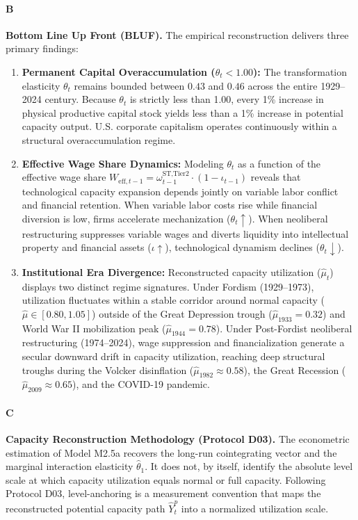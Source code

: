 \paragraph{B}
\textbf{Bottom Line Up Front (BLUF).} The empirical reconstruction delivers three primary findings:

\begin{enumerate}
	\item \textbf{Permanent Capital Overaccumulation ($\theta_t < 1.00$):} The transformation elasticity $\theta_t$ remains bounded between $0.43$ and $0.46$ across the entire 1929–2024 century. Because $\theta_t$ is strictly less than 1.00, every 1\% increase in physical productive capital stock yields less than a 1\% increase in potential capacity output. U.S. corporate capitalism operates continuously within a structural overaccumulation regime.
	\item \textbf{Effective Wage Share Dynamics:} Modeling $\theta_t$ as a function of the effective wage share $W_{\text{eff}, t-1} = \omega_{t-1}^{\text{ST,Tier2}} \cdot (1 - \iota_{t-1})$ reveals that technological capacity expansion depends jointly on variable labor conflict and financial retention. When variable labor costs rise while financial diversion is low, firms accelerate mechanization ($\theta_t \uparrow$). When neoliberal restructuring suppresses variable wages and diverts liquidity into intellectual property and financial assets ($\iota \uparrow$), technological dynamism declines ($\theta_t \downarrow$).
	\item \textbf{Institutional Era Divergence:} Reconstructed capacity utilization ($\hat{\mu}_t$) displays two distinct regime signatures. Under Fordism (1929–1973), utilization fluctuates within a stable corridor around normal capacity ($\hat{\mu} \in [0.80, 1.05]$) outside of the Great Depression trough ($\hat{\mu}_{1933} = 0.32$) and World War II mobilization peak ($\hat{\mu}_{1944} = 0.78$). Under Post-Fordist neoliberal restructuring (1974–2024), wage suppression and financialization generate a secular downward drift in capacity utilization, reaching deep structural troughs during the Volcker disinflation ($\hat{\mu}_{1982} \approx 0.58$), the Great Recession ($\hat{\mu}_{2009} \approx 0.65$), and the COVID-19 pandemic.
\end{enumerate}

\paragraph{C}
\textbf{Capacity Reconstruction Methodology (Protocol D03).} The econometric estimation of Model M2.5a recovers the long-run cointegrating vector and the marginal interaction elasticity $\hat{\theta}_1$. It does not, by itself, identify the absolute level scale at which capacity utilization equals normal or full capacity. Following Protocol D03, level-anchoring is a measurement convention that maps the reconstructed potential capacity path $\hat{Y}_t^p$ into a normalized utilization scale.

